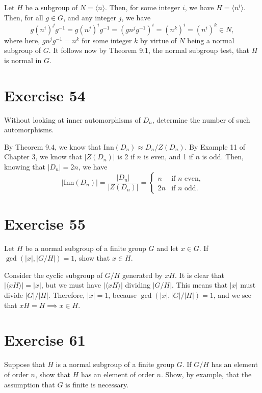\documentclass[12pt]{article}
\newcommand{\inn}{\mbox{Inn}}
\begin{document}
Let $H$ be a subgroup of $N=\langle n\rangle$.  Then, for some
integer $i$, we have $H=\langle n^i\rangle$.  Then, for all $g\in G$,
and any integer $j$, we have
\begin{equation*}
g(n^i)^jg^{-1}=g(n^j)^ig^{-1}=(gn^jg^{-1})^i=(n^k)^i=(n^i)^k\in N,
\end{equation*}
where here, $gn^jg^{-1}=n^k$ for some integer $k$ by
virtue of $N$ being a normal subgroup of $G$.  It follows
now by Theorem 9.1, the normal subgroup test, that $H$ is normal in $G$.

\section*{Exercise 54}

Without looking at inner automorphisms of $D_n$, determine the number
of such automorphisms.

By Theorem 9.4, we know that $\inn(D_n)\approx D_n/Z(D_n)$.
By Example 11 of Chapter 3, we know that $|Z(D_n)|$ is 2 if
$n$ is even, and 1 if $n$ is odd.  Then, knowing that $|D_n|=2n$,
we have
\begin{equation*}
|\inn(D_n)|=\frac{|D_n|}{|Z(D_n)|}=\left\{\begin{array}{ll}
n & \mbox{if $n$ even,} \\
2n & \mbox{if $n$ odd.}
\end{array}\right.
\end{equation*}

\section*{Exercise 55}

Let $H$ be a normal subgroup of a finite group $G$ and let $x\in G$.
If $\gcd(|x|,|G/H|)=1$, show that $x\in H$.

Consider the cyclic subgroup of $G/H$ generated by $xH$.
It is clear that $|\langle xH\rangle|=|x|$, but we must have
$|\langle xH\rangle|$ dividing $|G/H|$.  This means that
$|x|$ must divide $|G|/|H|$.  Therefore, $|x|=1$,
because $\gcd(|x|,|G|/|H|)=1$, and we see that
$xH=H\implies x\in H$.

\section*{Exercise 61}

Suppose that $H$ is a normal subgroup of a finite group $G$.
If $G/H$ has an element of order $n$, show that $H$ has an element of order $n$.
Show, by example, that the assumption that $G$ is finite is necessary.
\end{document}

